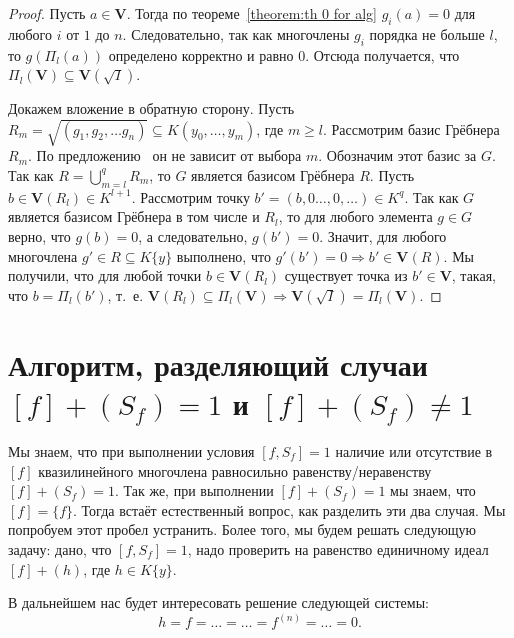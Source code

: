 \documentclass[16pt]{article}
\newcommand{\orange}[1]{{\color{orange}#1}}
\theoremstyle{plain1}
\theoremstyle{plain2}
\theoremstyle{plain}
\theoremstyle{plain3}
\theoremstyle{definition}
\theoremstyle{remark}
\begin{document}
\begin{proof}
Пусть $a\in \mathbf{V}$.
Тогда по теореме~\ref{theorem:th 0 for alg} $g_i(a)=0$ для любого $i$ от $1$ до $n$. Следовательно, так как многочлены $g_i$  порядка не больше $l$, то $g(\Pi_l(a))$ определено корректно и равно 0. Отсюда получается, что $\Pi_l(\mathbf{V})\subseteq\mathbf{V}(\sqrt{I})$.

Докажем вложение в обратную сторону. Пусть $R_m=\sqrt{(g_1,g_2,\ldots g_n)}\subseteq K(y_0,\ldots,y_m)$, где $m\geq l$. Рассмотрим базис Грёбнера $R_m$. По предложению~\cite[Chapter~IV, Section~2, Suggestion~8]{Cox} он не зависит от выбора $m$.
Обозначим этот базис за $G$. Так как $R=\bigcup\limits_{m=l}^{q}R_m$, то $G$ является базисом Грёбнера $R$.
Пусть $b\in\mathbf{V}(R_l)\in K^{l+1}$.
Рассмотрим точку $b'=(b,0\ldots,0,\ldots)\in K^{q}$. Так как $G$ является базисом Грёбнера в том числе и $R_l$, то для любого элемента $g\in G$ верно, что $g(b)=0$, а следовательно, $g(b')=0$.
Значит, для любого многочлена $g'\in R\subseteq K\{y\}$ выполнено, что $g'(b')=0\Rightarrow b'\in\mathbf{V}(R)$. Мы получили, что для любой точки $b\in\mathbf{V}(R_l)$ существует точка из $b'\in\mathbf{V}$, такая, что $b=\Pi_l(b')$, т.~е. $\mathbf{V}(R_l)\subseteq\Pi_l(\mathbf{V})\Rightarrow \mathbf{V}(\sqrt{I})=\Pi_l(\mathbf{V})$. 
\end{proof}

\section{Алгоритм, разделяющий случаи $[f]+(S_f)=1$ и $[f]+(S_f)\neq1$}

Мы знаем, что при выполнении условия $[f,S_f]=1$ наличие или отсутствие в $[f]$ квазилинейного многочлена равносильно равенству/неравенству $[f]+(S_f)=1$. Так же, при выполнении $[f]+(S_f)=1$ мы знаем, что $[f]=\{f\}$. Тогда встаёт естественный вопрос, как разделить эти два случая. Мы попробуем этот пробел устранить. Более того, мы будем решать следующую задачу: дано, что $[f,S_f]=1$, надо проверить на равенство единичному идеал $[f]+(h)$, где $h\in K\{y\}$.

В дальнейшем нас будет интересовать решение следующей системы:
\begin{equation}h=f=\ldots=\ldots=f^{(n)}=\ldots=0. \end{equation}
\end{document}
